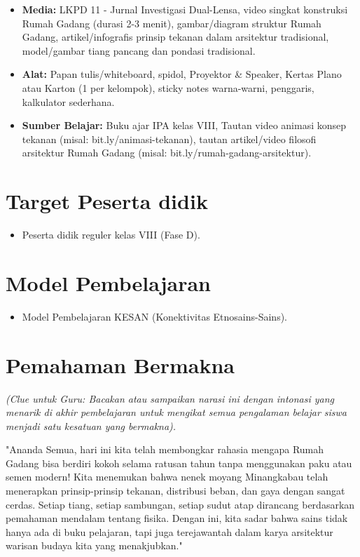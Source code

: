 \documentclass[12pt,a4paper]{article}
\begin{document}
\begin{itemize}
\item \textbf{Media:} LKPD 11 - Jurnal Investigasi Dual-Lensa, video singkat konstruksi Rumah Gadang (durasi 2-3 menit), gambar/diagram struktur Rumah Gadang, artikel/infografis prinsip tekanan dalam arsitektur tradisional, model/gambar tiang pancang dan pondasi tradisional.
\item \textbf{Alat:} Papan tulis/whiteboard, spidol, Proyektor \& Speaker, Kertas Plano atau Karton (1 per kelompok), sticky notes warna-warni, penggaris, kalkulator sederhana.
\item \textbf{Sumber Belajar:} Buku ajar IPA kelas VIII, Tautan video animasi konsep tekanan (misal: bit.ly/animasi-tekanan), tautan artikel/video filosofi arsitektur Rumah Gadang (misal: bit.ly/rumah-gadang-arsitektur).
\end{itemize}

\section{Target Peserta didik}

\begin{itemize}
\item Peserta didik reguler kelas VIII (Fase D).
\end{itemize}

\section{Model Pembelajaran}

\begin{itemize}
\item Model Pembelajaran KESAN (Konektivitas Etnosains-Sains).
\end{itemize}

\section{Pemahaman Bermakna}
\textit{(Clue untuk Guru: Bacakan atau sampaikan narasi ini dengan intonasi yang menarik di akhir pembelajaran untuk mengikat semua pengalaman belajar siswa menjadi satu kesatuan yang bermakna).}

\begin{tcolorbox}[mystyle]
"Ananda Semua, hari ini kita telah membongkar rahasia mengapa Rumah Gadang bisa berdiri kokoh selama ratusan tahun tanpa menggunakan paku atau semen modern! Kita menemukan bahwa nenek moyang Minangkabau telah menerapkan prinsip-prinsip tekanan, distribusi beban, dan gaya dengan sangat cerdas. Setiap tiang, setiap sambungan, setiap sudut atap dirancang berdasarkan pemahaman mendalam tentang fisika. Dengan ini, kita sadar bahwa sains tidak hanya ada di buku pelajaran, tapi juga terejawantah dalam karya arsitektur warisan budaya kita yang menakjubkan."
\end{tcolorbox}
\end{document}
